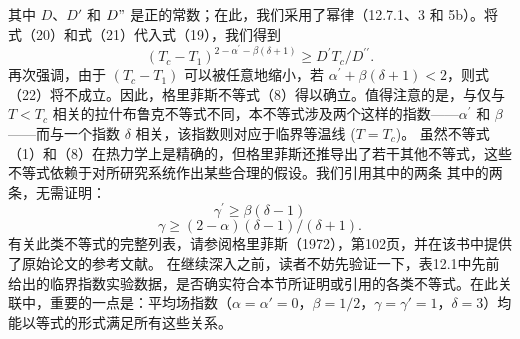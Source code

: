 其中 \(D\)、\(D'\) 和 \(D"\) 是正的常数；在此，我们采用了幂律（12.7.1、3 和 5b）。将式（20）和式（21）代入式（19），我们得到
\begin{equation}\tag{12.8.22}\label{eq:12.8.22}
( T _ { c } - T _ { 1 } ) ^{2 - \alpha ^ { \prime} - \beta ( \delta + 1 ) } \geq D ^{\prime} T _ { c } / D ^{\prime \prime} .
\end{equation}
再次强调，由于 \((T_{c}-T_{1})\) 可以被任意地缩小，若 \(\alpha^{\prime}+\beta(\delta+1)<2\)，则式（22）将不成立。因此，格里菲斯不等式（8）得以确立。值得注意的是，与仅与 \(T<T_{c}\) 相关的拉什布鲁克不等式不同，本不等式涉及两个这样的指数——\(\alpha^{\prime}\) 和 \(\beta\)——而与一个指数 \(\delta\) 相关，该指数则对应于临界等温线 (\(T=T_{c}\))。
虽然不等式（1）和（8）在热力学上是精确的，但格里菲斯还推导出了若干其他不等式，这些不等式依赖于对所研究系统作出某些合理的假设。我们引用其中的两条
其中的两条，无需证明：
\begin{equation}\tag{12.8.23}\label{eq:12.8.23}
\gamma ^{\prime} \geq \beta ( \delta - 1 )
\end{equation}
\begin{equation}\tag{12.8.24}\label{eq:12.8.24}
\gamma \geq ( 2 - \alpha ) ( \delta - 1 ) / ( \delta + 1 ) .
\end{equation}
有关此类不等式的完整列表，请参阅格里菲斯（1972），第102页，并在该书中提供了原始论文的参考文献。
在继续深入之前，读者不妨先验证一下，表12.1中先前给出的临界指数实验数据，是否确实符合本节所证明或引用的各类不等式。在此关联中，重要的一点是：平均场指数（\(\alpha=\alpha'=0\)，\(\beta=1/2\)，\(\gamma=\gamma'=1\)，\(\delta=3\)）均能以等式的形式满足所有这些关系。
